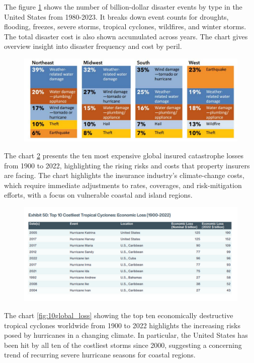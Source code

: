 \documentclass[12pt]{article}
\begin{document}
The figure \ref{fig:regional_disasters} shows the number of billion-dollar disaster events by type in the United States from 1980-2023. It breaks down event counts 
for droughts, flooding, freezes, severe storms, tropical cyclones, wildfires, and winter storms. The total disaster cost is also shown 
accumulated across years. The chart gives overview insight into disaster frequency and cost by peril.


\begin{figure}[ht]
    \centering
    \includegraphics[width=0.8\linewidth]{NAIC Property Threat by Regions.pdf}
    \label{fig:regional_disasters}
    \cite{naic}
\end{figure}

The chart \ref{fig:10economic_loss} presents the ten most expensive global insured catastrophe losses from 1900 to 2022, highlighting 
the rising risks and costs that property insurers are facing. The chart highlights the insurance industry's climate-change costs, which 
require immediate adjustments to rates, coverages, and risk-mitigation efforts, with a focus on vulnerable coastal and island regions.

\begin{figure}[ht]
    \centering
    \includegraphics[width=0.8\linewidth]{AON Top 10 Cyclones Economic Loss.pdf}
    \label{fig:10economic_loss}
    \cite{aon}
\end{figure}


The chart \ref{fig:10global_loss} showing the top ten economically destructive tropical cyclones worldwide from 1900 to 2022 
highlights the increasing risks posed by hurricanes in a changing climate. In particular, the United States has been hit by all ten 
of the costliest storms since 2000, suggesting a concerning trend of recurring severe hurricane seasons for coastal regions. 
\end{document}
